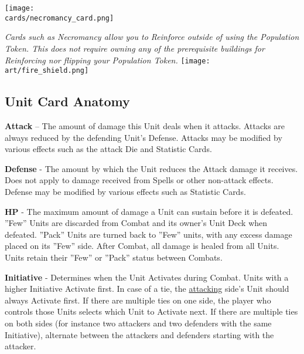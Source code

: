 \begin{multicols*}{2}
\begin{center}
  \texttt{[image: \\cards/necromancy\_card.png]}\par
  \footnotesize\textit{
    Cards such as Necromancy allow you to Reinforce outside of using the Population Token.
    This does not require owning any of the prerequisite buildings for Reinforcing nor flipping your Population Token.
  }
  \vfill
  \texttt{[image: \\art/fire\_shield.png]}
\end{center}

\clearpage

\end{multicols*}
\begin{multicols}{2}
\subsection*{Unit Card Anatomy}

\vspace{0pt}

\textbf{Attack} – The amount of damage this Unit deals when it attacks.
Attacks are always reduced by the defending Unit's Defense.
Attacks may be modified by various effects such as the attack Die and Statistic Cards.\par
\textbf{Defense} - The amount by which the Unit reduces the Attack damage it receives.
Does not apply to damage received from Spells or other non-attack effects.
Defense may be modified by various effects such as Statistic Cards.\par
\textbf{\hypertarget{HP}{HP}} - The maximum amount of damage a Unit can sustain before it is defeated.
”Few” Units are discarded from Combat and its owner's Unit Deck when defeated.
”Pack” Units are turned back to ”Few” units, with any excess damage placed on its ”Few” side.
After Combat, all damage is healed from all Units.
Units retain their ”Few” or ”Pack” status between Combats.\par
{\hypertarget{Initiative}{\textbf{Initiative}}} - Determines when the Unit Activates during Combat.
Units with a higher Initiative Activate first.
In case of a tie, the \hyperlink{Combatterminology}{attacking} side's Unit should always Activate first.
If there are multiple ties on one side, the player who controls those Units selects which Unit to Activate next.
If there are multiple ties on both sides (for instance two attackers and two defenders with the same Initiative), alternate between the attackers and defenders starting with the attacker.\par
\bigskip


\end{multicols}

